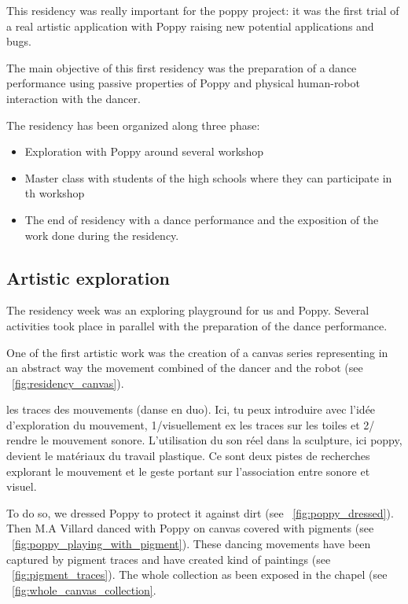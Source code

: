 This residency was really important for the poppy project: it was the first trial of a real artistic application with Poppy raising new potential applications and bugs.

The main objective of this first residency was the preparation of a dance performance using passive properties of Poppy and physical human-robot interaction with the dancer.


The residency has been organized along three phase:

\begin{itemize}
    \item Exploration with Poppy around several workshop
    \item Master class with students of the high schools where they can participate in th workshop
    \item The end of residency with a dance performance and the exposition of the work done during the residency.
\end{itemize}


\subsection{Artistic exploration} %

The residency week was an exploring playground for us and Poppy. Several activities took place in parallel with the preparation of the dance performance.

One of the first artistic work was the creation of a canvas series representing in an abstract way the movement combined of the dancer and the robot (see \figurename~\ref{fig:residency_canvas}).

les traces des mouvements (danse en duo). Ici, tu peux introduire avec l’idée d’exploration du mouvement, 1/visuellement ex les traces sur les toiles et 2/  rendre  le mouvement sonore. L'utilisation du son réel dans la sculpture, ici poppy, devient le matériaux du travail plastique.
Ce sont deux pistes de  recherches explorant le mouvement et le geste portant sur l'association entre sonore et visuel.

To do so, we dressed Poppy to protect it against dirt (see \figurename~\ref{fig:poppy_dressed}). Then M.A Villard danced with Poppy on canvas covered with pigments (see \figurename~\ref{fig:poppy_playing_with_pigment}). These dancing movements have been captured by pigment traces and have created kind of paintings (see \figurename~\ref{fig:pigment_traces}). The whole collection as been exposed in the chapel (see \figurename~\ref{fig:whole_canvas_collection}.


